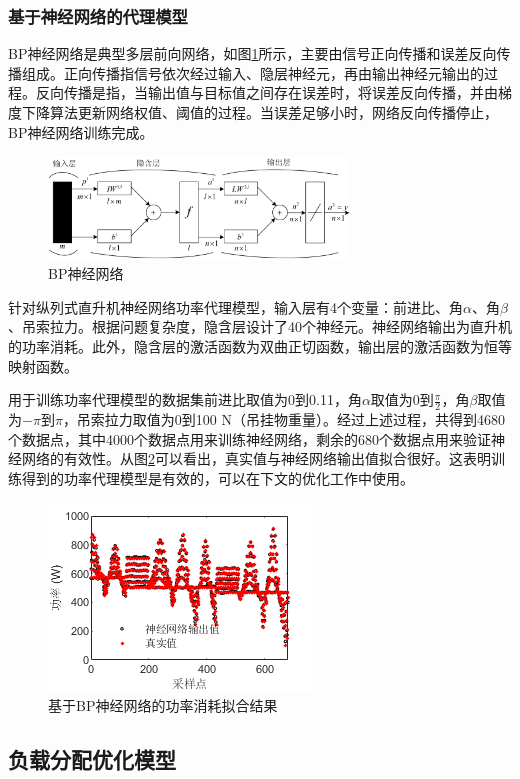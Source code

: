 \subsubsection{基于神经网络的代理模型}
BP神经网络是典型多层前向网络，如图\ref{fig:4_2_2}所示，主要由信号正向传播和误差反向传播组成。正向传播指信号依次经过输入、隐层神经元，再由输出神经元输出的过程。反向传播是指，当输出值与目标值之间存在误差时，将误差反向传播，并由梯度下降算法更新网络权值、阈值的过程。当误差足够小时，网络反向传播停止，BP神经网络训练完成。
\begin{figure}[!htb]
  \includegraphics[width=8cm]{fig/figure_chap4/Chap4_2_3.png}
  \caption{BP神经网络}
  \label{fig:4_2_2}
\end{figure}

针对纵列式直升机神经网络功率代理模型，输入层有4个变量：前进比、角$\alpha$、角$\beta$、吊索拉力。根据问题复杂度，隐含层设计了40个神经元。神经网络输出为直升机的功率消耗。此外，隐含层的激活函数为双曲正切函数，输出层的激活函数为恒等映射函数。

用于训练功率代理模型的数据集前进比取值为0到0.11，角$\alpha$取值为0到$\frac{\pi}{2}$，角$\beta$取值为$-\pi$到$\pi$，吊索拉力取值为0到100 N（吊挂物重量）。经过上述过程，共得到4680个数据点，其中4000个数据点用来训练神经网络，剩余的680个数据点用来验证神经网络的有效性。从图\ref{fig:4_2_3}可以看出，真实值与神经网络输出值拟合很好。这表明训练得到的功率代理模型是有效的，可以在下文的优化工作中使用。
\begin{figure}[!htb]
  \includegraphics[width=7cm]{fig/figure_chap4/Chap4_2_4.png}
  \caption{基于BP神经网络的功率消耗拟合结果}
  \label{fig:4_2_3}
\end{figure}

\subsection{负载分配优化模型}
